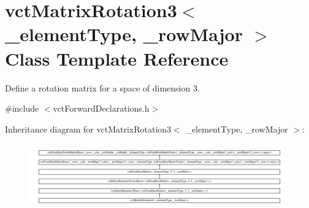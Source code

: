 \hypertarget{classvct_matrix_rotation3}{}\section{vct\+Matrix\+Rotation3$<$ \+\_\+element\+Type, \+\_\+row\+Major $>$ Class Template Reference}
\label{classvct_matrix_rotation3}


Define a rotation matrix for a space of dimension 3.  




{\ttfamily \#include $<$vct\+Forward\+Declarations.\+h$>$}

Inheritance diagram for vct\+Matrix\+Rotation3$<$ \+\_\+element\+Type, \+\_\+row\+Major $>$\+:\begin{figure}[H]
\begin{center}
\leavevmode
\includegraphics[height=2.840237cm]{d2/d92/classvct_matrix_rotation3}
\end{center}
\end{figure}
